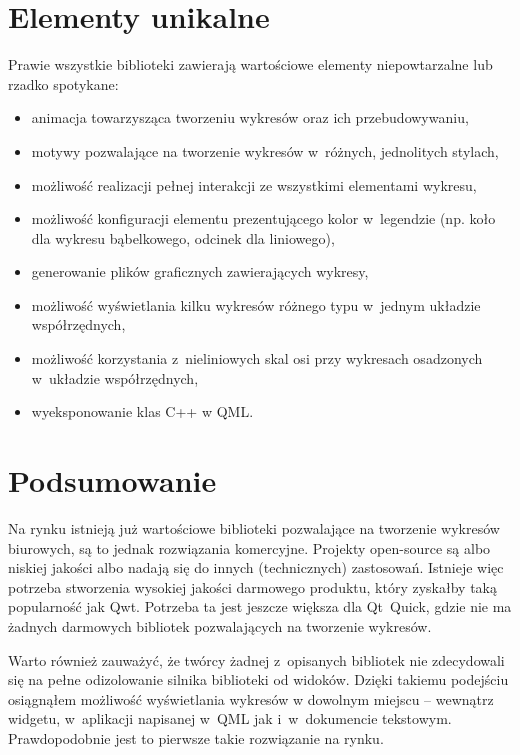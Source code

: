 \section{Elementy unikalne}
Prawie wszystkie biblioteki zawierają wartościowe elementy niepowtarzalne lub rzadko spotykane:
\begin{itemize}
\item{animacja towarzysząca tworzeniu wykresów oraz ich przebudowywaniu,}
\item{motywy pozwalające na tworzenie wykresów w~różnych, jednolitych stylach,}
\item{możliwość realizacji pełnej interakcji ze wszystkimi elementami wykresu,}
\item{możliwość konfiguracji elementu prezentującego kolor w~legendzie (np. koło dla wykresu bąbelkowego, odcinek dla liniowego),}
\item{generowanie plików graficznych zawierających wykresy,}
\item{możliwość wyświetlania kilku wykresów różnego typu w~jednym układzie współrzędnych,}
\item{możliwość korzystania z~nieliniowych skal osi przy wykresach osadzonych w~układzie współrzędnych,}
\item{wyeksponowanie klas C++ w QML.}
\end{itemize}

\section{Podsumowanie}
Na rynku istnieją już wartościowe biblioteki pozwalające na tworzenie wykresów biurowych, są to jednak rozwiązania komercyjne. Projekty open-source są albo niskiej jakości albo nadają się do innych (technicznych) zastosowań. Istnieje więc potrzeba stworzenia wysokiej jakości darmowego produktu, który zyskałby taką popularność jak Qwt. Potrzeba ta jest jeszcze większa dla Qt~Quick, gdzie nie ma żadnych darmowych bibliotek pozwalających na tworzenie wykresów.

Warto również zauważyć, że twórcy żadnej z~opisanych bibliotek nie zdecydowali się na pełne odizolowanie silnika biblioteki od widoków. Dzięki takiemu podejściu osiągnąłem możliwość wyświetlania wykresów w dowolnym miejscu -- wewnątrz widgetu, w~aplikacji napisanej w~QML jak i~w~dokumencie tekstowym. Prawdopodobnie jest to pierwsze takie rozwiązanie na rynku.


